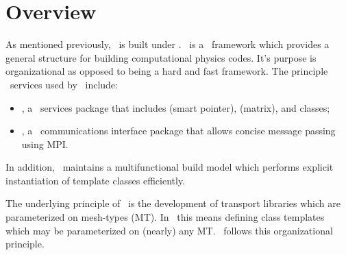 
\section{Overview}

As mentioned previously, \imctest\ is built under \draco.  \draco\ is a
\cpp\ framework which provides a general structure for building
computational physics codes.  It's purpose is organizational as
opposed to being a hard and fast framework.  The principle \draco\ services
used by \imctest\ include:
\begin{itemize}
\item \dspp, a \cpp\ services package that includes  (smart
  pointer),  (matrix), and  classes;
\item \cccc, a \cpp\ communications interface package that allows
  concise message passing using MPI.
\end{itemize}
In addition, \draco\ maintains a multifunctional build model which
performs explicit instantiation of template classes efficiently.

The underlying principle of \draco\ is the development of transport
libraries which are parameterized on mesh-types (MT).  In \cpp\ this
means defining class templates which may be parameterized on (nearly)
any MT.  \imctest\ follows this organizational principle. 

